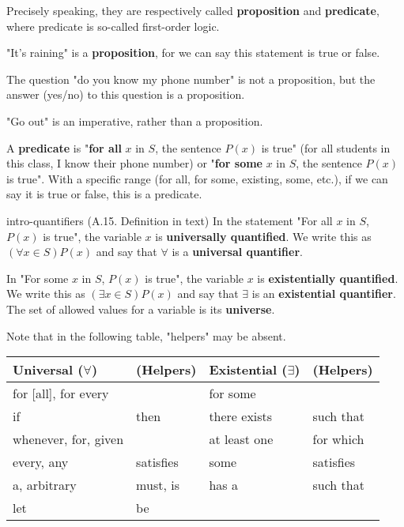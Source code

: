 \documentclass[../src/handouts/main.tex]{subfiles}
\begin{document}
Precisely speaking, they are respectively called \textbf{proposition} and \textbf{predicate}, where predicate is so-called first-order logic.

"It's raining" is a \textbf{proposition}, for we can say this statement is true or false.

The question "do you know my phone number" is not a proposition, but the answer (yes/no) to this question is a proposition.

"Go out" is an imperative, rather than a proposition.

A \textbf{predicate} is "\textbf{for all} $x$ in $S$, the sentence $P(x)$ is true" (for all students in this class, I know their phone number) or "\textbf{for some} $x$ in $S$, the sentence $P(x)$ is true". With a specific range (for all, for some, existing, some, etc.), if we can say it is true or false, this is a predicate.

\begin{definition}{}{intro-quantifiers}
  (A.15. Definition in text)
  In the statement "For all $x$ in $S$, $P(x)$ is true", the variable $x$ is \textbf{universally quantified}. We write this as $(\forall x \in S) P(x)$ and say that $\forall$ is a \textbf{universal quantifier}.

  In "For some $x$ in $S$, $P(x)$ is true", the variable $x$ is \textbf{existentially quantified}. We write this as $(\exists x \in S) P(x)$ and say that $\exists$ is an \textbf{existential quantifier}. The set of allowed values for a variable is its \textbf{universe}.

  Note that in the following table, "helpers" may be absent.

  \centering
  \begin{tabular}{ll|ll}
    Universal ($\forall$) & (Helpers) & Existential ($\exists$) & (Helpers) \\ \hline
    for [all], for every  &           & for some                &           \\
    if                    & then      & there exists            & such that \\
    whenever, for, given  &           & at least one            & for which \\
    every, any            & satisfies & some                    & satisfies \\
    a, arbitrary          & must, is  & has a                   & such that \\
    let                   & be        &                         &
  \end{tabular}
\end{definition}
\end{document}
